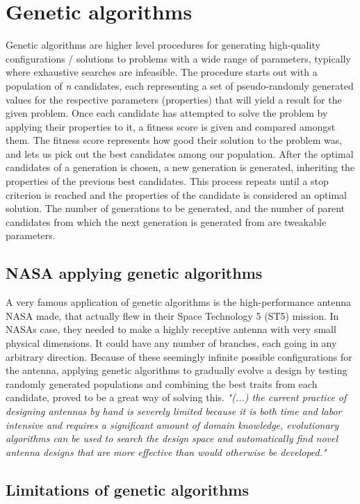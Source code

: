 \documentclass[a4paper,english]{report}
\begin{document}
			\section{Genetic algorithms}
			Genetic algorithms are higher level procedures for generating high-quality configurations / solutions to problems with a wide range of parameters, typically where exhaustive searches are infeasible. The procedure starts out with a population of \textit{n} candidates, each representing a set of pseudo-randomly generated values for the respective parameters (properties) that will yield a result for the given problem. Once each candidate has attempted to solve the problem by applying their properties to it, a fitness score is given and compared amongst them. The fitness score represents how good their solution to the problem was, and lets us pick out the best candidates among our population. After the optimal candidates of a generation is chosen, a new generation is generated, inheriting the properties of the previous best candidates. This process repeats until a stop criterion is reached and the properties of the candidate is considered an optimal solution. The number of generations to be generated, and the number of parent candidates from which the next generation is generated from are tweakable parameters. 
				\subsection{NASA applying genetic algorithms}A very famous application of genetic algorithms is the high-performance antenna NASA made, that actually flew in their Space Technology 5 (ST5) mission\cite{nasa}. In NASAs case, they needed to make a highly receptive antenna with very small physical dimensions. It could have any number of branches, each going in any arbitrary direction. Because of these seemingly infinite possible configurations for the antenna, applying genetic algorithms to gradually evolve a design by testing randomly generated populations and combining the best traits from each candidate, proved to be a great way of solving this. \emph{"(...) the current practice of designing antennas by hand is severely limited because it is both time and labor intensive and requires a significant amount of domain knowledge, evolutionary algorithms can be used to search the design space and automatically find novel antenna designs that are more effective than would otherwise be developed."}\cite{nasa}
				\subsection{Limitations of genetic algorithms}
\end{document}
